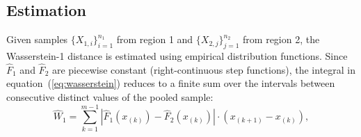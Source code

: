 \documentclass[AMA,Times1COL]{WileyNJDv5}
\begin{document}
\subsection{Estimation}\label{sec:estimation}

Given samples $\{X_{1,i}\}_{i=1}^{n_1}$ from region 1 and $\{X_{2,j}\}_{j=1}^{n_2}$ from region 2, the Wasserstein-1 distance is estimated using empirical distribution functions. Since $\hat{F}_1$ and $\hat{F}_2$ are piecewise constant (right-continuous step functions), the integral in equation~(\ref{eq:wasserstein}) reduces to a finite sum over the intervals between consecutive distinct values of the pooled sample:
\begin{equation}
\widehat{W}_1 = \sum_{k=1}^{m-1} |\hat{F}_1(x_{(k)}) - \hat{F}_2(x_{(k)})| \cdot (x_{(k+1)} - x_{(k)}),
\label{eq:estimator}
\end{equation}
\end{document}
